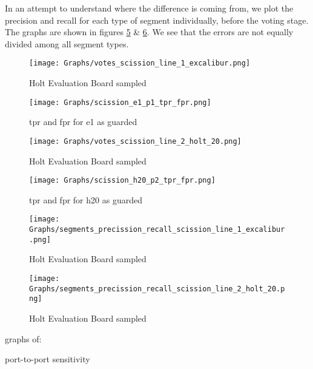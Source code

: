 \documentclass[conference]{IEEEtran}
\begin{document}
  In an attempt to understand where the difference is coming from, we plot the precision and recall for each type of segment individually, before the voting stage. The graphs are shown in figures \ref{fig:segments_comparison_excalibur_1} \& \ref{fig:segments_comparison_holt_20}. We see that the errors are not equally divided among all segment types.

  \begin{figure}[t]
    \centering
    \texttt{[image: Graphs/votes\_scission\_line\_1\_excalibur.png]}
    \caption{Holt Evaluation Board sampled}
    \label{fig:votes_excalibur_1}
  \end{figure}
  
  \begin{figure}[t]
    \centering
    \texttt{[image: Graphs/scission\_e1\_p1\_tpr\_fpr.png]}
    \caption{tpr and fpr for e1 as guarded}
    \label{fig:tpr_fpr_e1_p1}
  \end{figure}
  
  \begin{figure}[t]
    \centering
    \texttt{[image: Graphs/votes\_scission\_line\_2\_holt\_20.png]}
    \caption{Holt Evaluation Board sampled}
    \label{fig:votes_holt_20}
  \end{figure}
  
  \begin{figure}[t]
    \centering
    \texttt{[image: Graphs/scission\_h20\_p2\_tpr\_fpr.png]}
    \caption{tpr and fpr for h20 as guarded}
    \label{fig:tpr_fpr_h20_p2}
  \end{figure}
  
  \begin{figure}[t]
    \centering
    \texttt{[image: Graphs/segments\_precission\_recall\_scission\_line\_1\_excalibur.png]}
    \caption{Holt Evaluation Board sampled}
    \label{fig:segments_comparison_excalibur_1}
  \end{figure}
  
  \begin{figure}[t]
    \centering
    \texttt{[image: Graphs/segments\_precission\_recall\_scission\_line\_2\_holt\_20.png]}
    \caption{Holt Evaluation Board sampled}
    \label{fig:segments_comparison_holt_20}
  \end{figure}
  
  graphs of:

   port-to-port sensitivity
\end{document}
